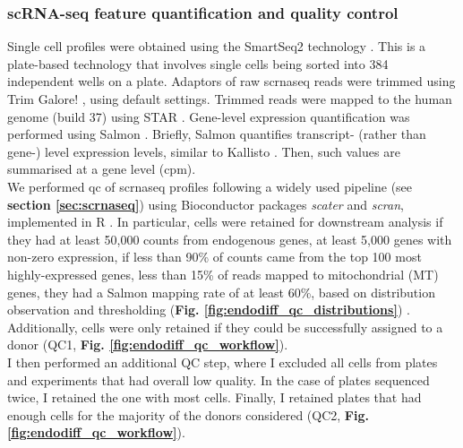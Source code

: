 \subsubsection{scRNA-seq feature quantification and quality control}

Single cell profiles were obtained using the SmartSeq2 technology \cite{picelli2013smart}. 
This is a plate-based technology that involves single cells being sorted into 384 independent wells on a plate. 
Adaptors of raw \gls{scrnaseq} reads were trimmed using Trim Galore! \cite{galore2015wrapper, martin2011cutadapt, andrews2010fastqc}, using default settings. 
Trimmed reads were mapped to the human genome (build 37) using STAR \cite{dobin2013star}. 
Gene-level expression quantification was performed using Salmon \cite{patro2017salmon}. 
Briefly, Salmon quantifies transcript- (rather than gene-) level expression levels, similar to Kallisto \cite{bray2016near}.
Then, such values are summarised at a gene level (\gls{cpm}).\\


We performed \gls{qc} of \gls{scrnaseq} profiles following a widely used pipeline (see \textbf{section \ref{sec:scrnaseq}}) using Bioconductor packages \textit{scater} and \textit{scran}, implemented in R \cite{lun2016step, mccarthy2017scater, lun2019singlecellexperiment}.  
In particular, cells were retained for downstream analysis if they had at least 50,000 counts from endogenous genes, at least 5,000 genes with non-zero expression, if less than 90\% of counts came from the top 100 most highly-expressed genes, less than 15\% of reads mapped to mitochondrial (MT) genes, they had a Salmon mapping rate of at least 60\%, based on distribution observation and thresholding (\textbf{Fig. \ref{fig:endodiff_qc_distributions}}) \cite{luecken2019current}.
Additionally, cells were only retained if they could be successfully assigned to a donor (QC1, \textbf{Fig. \ref{fig:endodiff_qc_workflow}}). \\ 

I then performed an additional QC step, where I excluded all cells from plates and experiments that had overall low quality.
In the case of plates sequenced twice, I retained the one with most cells.
Finally, I retained plates that had enough cells for the majority of the donors considered (QC2, \textbf{Fig. \ref{fig:endodiff_qc_workflow}}). 

